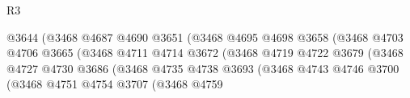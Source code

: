 \begin{lexlean}{R3}
\begin{coremodule}
                                                    @3644
                                                    (@3468
                                                      @4687
                                                      @4690
                                                      @3651
                                                      (@3468
                                                        @4695
                                                        @4698
                                                        @3658
                                                        (@3468
                                                          @4703
                                                          @4706
                                                          @3665
                                                          (@3468
                                                            @4711
                                                            @4714
                                                            @3672
                                                            (@3468
                                                              @4719
                                                              @4722
                                                              @3679
                                                              (@3468
                                                                @4727
                                                                @4730
                                                                @3686
                                                                (@3468
                                                                  @4735
                                                                  @4738
                                                                  @3693
                                                                  (@3468
                                                                    @4743
                                                                    @4746
                                                                    @3700
                                                                    (@3468
                                                                      @4751
                                                                      @4754
                                                                      @3707
                                                                      (@3468
                                                                        @4759

\end{coremodule}
\end{lexlean}
